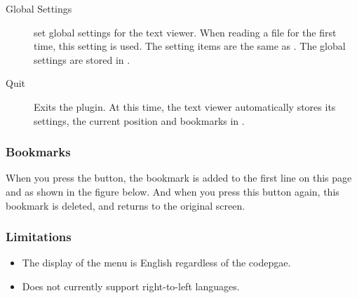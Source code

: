 \begin{description}

\item[Global Settings] set global settings for the text viewer. When reading a file for the first time, this setting is used. The setting items are the same as . The global settings are stored in .
\item[Quit] Exits the plugin. At this time, the text viewer automatically stores its settings, the current position and bookmarks in .
\end{description}

\subsubsection{Bookmarks}
    When you press the %
     button, the bookmark is added to the first 
    line on this page and 
     as shown in the figure below. 
    And when you press this button again, this bookmark is deleted, and returns to the original 
    screen.



\subsubsection{Limitations}

\begin{itemize}
\item The display of the menu is English regardless of the codepgae. 
\item Does not currently support right{}-to{}-left languages.
\end{itemize}
